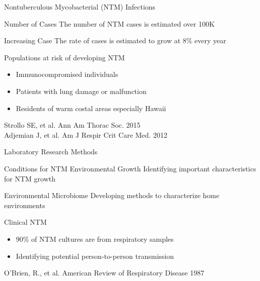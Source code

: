 \documentclass[11pt]{beamer}
\begin{document}
	\begin{frame}{Nontuberculous Mycobacterial (NTM) Infections}
		\begin{block}{Number of Cases}
		The number of NTM cases is estimated over 100K
		\end{block}
		
		\begin{block}{Increasing Case}
		The rate of cases is estimated to grow at 8\% every year
		\end{block}
		
		
		\begin{block}{Populations at risk of developing NTM}
		\begin{itemize}
		\item Immunocompromised individuals 
		\item Patients with lung damage or malfunction 
		\item Residents of warm costal areas especially Hawaii
		\end{itemize}
		\end{block} 
		
		\begin{block}
		
		\end{block}
	\vspace{-1cm}
	\tiny{Strollo SE, et al. Ann Am Thorac Soc. 2015 \\
	Adjemian J, et al. Am J Respir Crit Care Med. 2012}
	
	\end{frame}
	\begin{frame}{Laboratory Research Methods}
	\begin{block}{Conditions for NTM Environmental Growth}
	Identifying important characteristics for NTM growth 
	\end{block}
	
	\begin{block}{Environmental Microbiome}
	Developing methods to characterize home environments
	\end{block}
	
	\begin{block}{Clinical NTM}
	\begin{itemize}
	\item 90\% of NTM cultures are from respiratory samples
	\item Identifying potential person-to-person transmission
	\end{itemize}
	\end{block}
	
	\tiny{O'Brien, R., et al. American Review of Respiratory Disease 1987}

	
	\end{frame}
	
\end{document}
